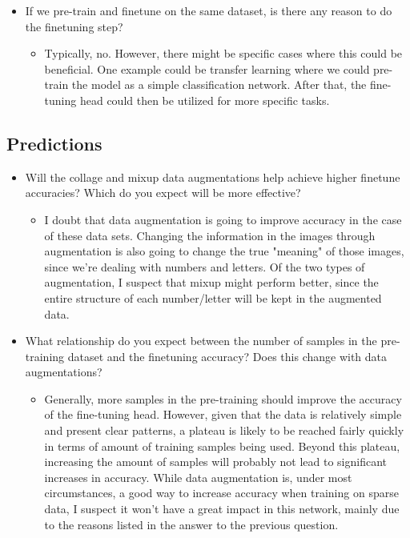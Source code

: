 \documentclass[english,11pt,a4paper,titlepage]{report}
\begin{document}
\begin{itemize}
\begin{itemize}
		\end{itemize}
		\item If we pre-train and finetune on the same dataset, is there any reason to do the finetuning step?
		\begin{itemize}
			\item Typically, no. However, there might be specific cases where this could be beneficial. One example could be transfer learning where we could pre-train the model as a simple classification network. After that, the fine-tuning head could then be utilized for more specific tasks.
		\end{itemize}
	\end{itemize}
	\subsection*{Predictions}
	\begin{itemize}
		\item Will the collage and mixup data augmentations help achieve higher finetune accuracies? Which do you expect will be more effective?
		\begin{itemize}
			\item I doubt that data augmentation is going to improve accuracy in the case of these data sets. Changing the information in the images through augmentation is also going to change the true "meaning" of those images, since we're dealing with numbers and letters. Of the two types of augmentation, I suspect that mixup might perform better, since the entire structure of each number/letter will be kept in the augmented data.
		\end{itemize}
		\item What relationship do you expect between the number of samples in the pre-training dataset and the finetuning accuracy? Does this change with data augmentations?
		\begin{itemize}
			\item Generally, more samples in the pre-training should improve the accuracy of the fine-tuning head. However, given that the data is relatively simple and present clear patterns, a plateau is likely to be reached fairly quickly in terms of amount of training samples being used. Beyond this plateau, increasing the amount of samples will probably not lead to significant increases in accuracy. While data augmentation is, under most circumstances, a good way to increase accuracy when training on sparse data, I suspect it won't have a great impact in this network, mainly due to the reasons listed in the answer to the previous question.
		\end{itemize}
	\end{itemize}
	
\end{document}
